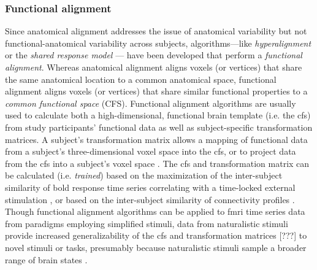 \subsubsection{Functional alignment}

%
Since anatomical alignment addresses the issue of anatomical variability but not
functional-anatomical variability across subjects, algorithms---like
\textit{hyperalignment} \citep{haxby2011common, guntupalli2016model} or the
\textit{shared response model} \citep{chen2015reduced, zhang2016searchlight}---
have been developed that perform a \textit{functional alignment}.
%
Whereas anatomical alignment aligns voxels (or vertices) that share the same
anatomical location to a common anatomical space, functional alignment aligns
voxels (or vertices) that share similar functional properties to a
\textit{common functional space} (CFS).
%
Functional alignment algorithms are usually used to calculate both a
high-dimensional, functional brain template (i.e. the \ac{cfs}) from study
participants' functional data as well as subject-specific transformation
matrices.
%
%
A subject's transformation matrix allows a mapping of functional data from a
subject's three-dimensional voxel space into the \ac{cfs}, or to project data
from the \ac{cfs} into a subject's voxel space \citep{haxby2020hyperalignment,
kumar2020brainiak}.
%
The \ac{cfs} and transformation matrix can be calculated (i.e.
\textit{trained}) based on the maximization of the inter-subject similarity of
\ac{bold} response time series correlating with a time-locked external
stimulation \citep{haxby2011common, chen2015reduced, sabuncu2010function}, or
based on the inter-subject similarity of connectivity profiles
\citep{feilong2018reliable, guntupalli2018computational, nastase2019leveraging}.
%
Though functional alignment algorithms can be applied to \ac{fmri} time series
data from paradigms employing simplified stimuli, data from naturalistic stimuli
provide
%
increased generalizability of the \ac{cfs}
%
and transformation matrices [???]
%
to novel stimuli or tasks, presumably because naturalistic stimuli sample a
broader range of brain states \citep{haxby2011common, guntupalli2016model}.







